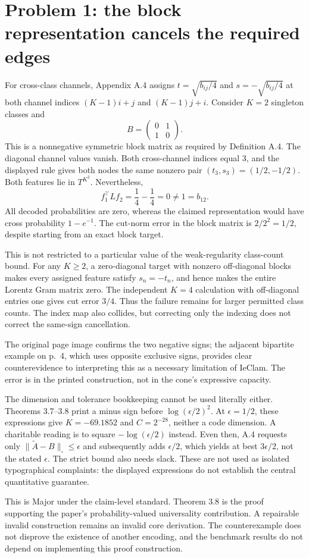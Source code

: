 \documentclass[10pt]{article}
\begin{document}
\section*{Problem 1: the block representation cancels the required edges}
For cross-class channels, Appendix A.4 assigns \(t=\sqrt{b_{ij}/4}\) and \(s=-\sqrt{b_{ij}/4}\) at both channel indices \((K-1)i+j\) and \((K-1)j+i\). Consider \(K=2\) singleton classes and \[B=\begin{pmatrix}0&1\\1&0\end{pmatrix}.\] This is a nonnegative symmetric block matrix as required by Definition A.4. The diagonal channel values vanish. Both cross-channel indices equal \(3\), and the displayed rule gives both nodes the same nonzero pair \((t_3,s_3)=(1/2,-1/2)\). Both features lie in \(T^{K^2}\). Nevertheless, \[f_1^\top Lf_2=\frac14-\frac14=0\ne1=b_{12}.\] All decoded probabilities are zero, whereas the claimed representation would have cross probability \(1-e^{-1}\). The cut-norm error in the block matrix is \(2/2^2=1/2\), despite starting from an exact block target.\par
This is not restricted to a particular value of the weak-regularity class-count bound. For any \(K\ge2\), a zero-diagonal target with nonzero off-diagonal blocks makes every assigned feature satisfy \(s_n=-t_n\), and hence makes the entire Lorentz Gram matrix zero. The independent \(K=4\) calculation with off-diagonal entries one gives cut error \(3/4\). Thus the failure remains for larger permitted class counts. The index map also collides, but correcting only the indexing does not correct the same-sign cancellation.\par
The original page image confirms the two negative signs; the adjacent bipartite example on p. 4, which uses opposite exclusive signs, provides clear counterevidence to interpreting this as a necessary limitation of IeClam. The error is in the printed construction, not in the cone’s expressive capacity.\par
The dimension and tolerance bookkeeping cannot be used literally either. Theorems 3.7–3.8 print a minus sign before \(\log(\epsilon/2)^2\). At \(\epsilon=1/2\), these expressions give \(K=-69.1852\) and \(C=2^{-28}\), neither a code dimension. A charitable reading is to square \(-\log(\epsilon/2)\) instead. Even then, A.4 requests only \(\|\widetilde A-B\|_\square\le\epsilon\) and subsequently adds \(\epsilon/2\), which yields at best \(3\epsilon/2\), not the stated \(\epsilon\). The strict bound also needs slack. These are not used as isolated typographical complaints: the displayed expressions do not establish the central quantitative guarantee.\par
This is Major under the claim-level standard. Theorem 3.8 is the proof supporting the paper’s probability-valued universality contribution. A repairable invalid construction remains an invalid core derivation. The counterexample does not disprove the existence of another encoding, and the benchmark results do not depend on implementing this proof construction.\par
\end{document}
